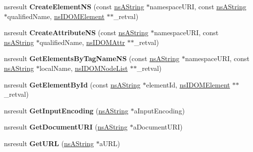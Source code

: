 \begin{DoxyCompactItemize}
nsresult {\bfseries Create\+Element\+NS} (const \hyperlink{structns_string_container}{ns\+A\+String} $\ast$namespace\+U\+RI, const \hyperlink{structns_string_container}{ns\+A\+String} $\ast$qualified\+Name, \hyperlink{interfacens_i_d_o_m_element}{ns\+I\+D\+O\+M\+Element} $\ast$$\ast$\+\_\+retval)
\item 
\mbox{\label{interfacens_i_d_o_m_document_a44fb6884fa017a1fe47c14d257652be8}} 
nsresult {\bfseries Create\+Attribute\+NS} (const \hyperlink{structns_string_container}{ns\+A\+String} $\ast$namespace\+U\+RI, const \hyperlink{structns_string_container}{ns\+A\+String} $\ast$qualified\+Name, \hyperlink{interfacens_i_d_o_m_attr}{ns\+I\+D\+O\+M\+Attr} $\ast$$\ast$\+\_\+retval)
\item 
\mbox{\label{interfacens_i_d_o_m_document_ada93ee35fdaedadcf3f9d17ef014716b}} 
nsresult {\bfseries Get\+Elements\+By\+Tag\+Name\+NS} (const \hyperlink{structns_string_container}{ns\+A\+String} $\ast$namespace\+U\+RI, const \hyperlink{structns_string_container}{ns\+A\+String} $\ast$local\+Name, \hyperlink{interfacens_i_d_o_m_node_list}{ns\+I\+D\+O\+M\+Node\+List} $\ast$$\ast$\+\_\+retval)
\item 
\mbox{\label{interfacens_i_d_o_m_document_ac6e30bc53bc2b273c87d2a25d922196e}} 
nsresult {\bfseries Get\+Element\+By\+Id} (const \hyperlink{structns_string_container}{ns\+A\+String} $\ast$element\+Id, \hyperlink{interfacens_i_d_o_m_element}{ns\+I\+D\+O\+M\+Element} $\ast$$\ast$\+\_\+retval)
\item 
\mbox{\label{interfacens_i_d_o_m_document_a5b2a1558043123d91c171c7a89cf1633}} 
nsresult {\bfseries Get\+Input\+Encoding} (\hyperlink{structns_string_container}{ns\+A\+String} $\ast$a\+Input\+Encoding)
\item 
\mbox{\label{interfacens_i_d_o_m_document_ac7ce77897e47579bb8a61018a52a88a1}} 
nsresult {\bfseries Get\+Document\+U\+RI} (\hyperlink{structns_string_container}{ns\+A\+String} $\ast$a\+Document\+U\+RI)
\item 
\mbox{\label{interfacens_i_d_o_m_document_ab3ad2616e1a1cd677941feac34134595}} 
nsresult {\bfseries Get\+U\+RL} (\hyperlink{structns_string_container}{ns\+A\+String} $\ast$a\+U\+RL)

\end{DoxyCompactItemize}
